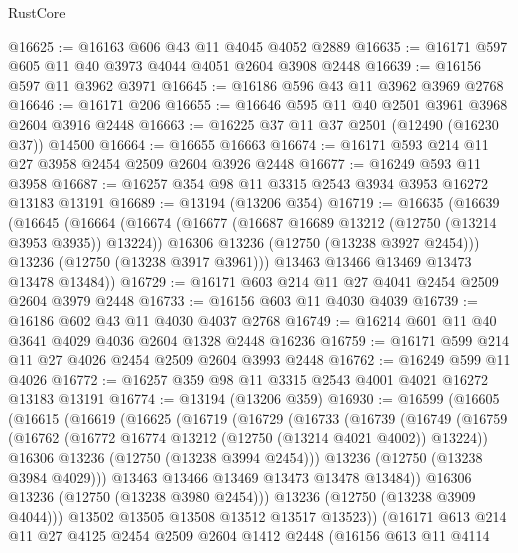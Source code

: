 \begin{lexlean}{RustCore}
\begin{coremodule}
@16625 := @16163 @606 @43 @11 @4045 @4052 @2889
@16635 := @16171 @597 @605 @11 @40 @3973 @4044 @4051 @2604 @3908 @2448
@16639 := @16156 @597 @11 @3962 @3971
@16645 := @16186 @596 @43 @11 @3962 @3969 @2768
@16646 := @16171 @206
@16655 := @16646 @595 @11 @40 @2501 @3961 @3968 @2604 @3916 @2448
@16663 := @16225 @37 @11 @37 @2501 (@12490 (@16230 @37)) @14500
@16664 := @16655 @16663
@16674 := @16171 @593 @214 @11 @27 @3958 @2454 @2509 @2604 @3926 @2448
@16677 := @16249 @593 @11 @3958
@16687 := @16257 @354 @98 @11 @3315 @2543 @3934 @3953 @16272 @13183 @13191
@16689 := @13194 (@13206 @354)
@16719 := @16635
    (@16639
      (@16645
        (@16664
          (@16674
            (@16677 (@16687 @16689 @13212 (@12750 (@13214 @3953 @3935)) @13224))
            @16306
            @13236
            (@12750 (@13238 @3927 @2454)))
          @13236
          (@12750 (@13238 @3917 @3961)))
        @13463
        @13466
        @13469
        @13473
        @13478
        @13484))
@16729 := @16171 @603 @214 @11 @27 @4041 @2454 @2509 @2604 @3979 @2448
@16733 := @16156 @603 @11 @4030 @4039
@16739 := @16186 @602 @43 @11 @4030 @4037 @2768
@16749 := @16214 @601 @11 @40 @3641 @4029 @4036 @2604 @1328 @2448 @16236
@16759 := @16171 @599 @214 @11 @27 @4026 @2454 @2509 @2604 @3993 @2448
@16762 := @16249 @599 @11 @4026
@16772 := @16257 @359 @98 @11 @3315 @2543 @4001 @4021 @16272 @13183 @13191
@16774 := @13194 (@13206 @359)
@16930 := @16599
    (@16605
      (@16615
        (@16619
          (@16625
            (@16719
              (@16729
                (@16733
                  (@16739
                    (@16749
                      (@16759
                        (@16762 (@16772 @16774 @13212 (@12750 (@13214 @4021 @4002)) @13224))
                        @16306
                        @13236
                        (@12750 (@13238 @3994 @2454)))
                      @13236
                      (@12750 (@13238 @3984 @4029)))
                    @13463
                    @13466
                    @13469
                    @13473
                    @13478
                    @13484))
                @16306
                @13236
                (@12750 (@13238 @3980 @2454)))
              @13236
              (@12750 (@13238 @3909 @4044)))
            @13502
            @13505
            @13508
            @13512
            @13517
            @13523))
        (@16171
          @613
          @214
          @11
          @27
          @4125
          @2454
          @2509
          @2604
          @1412
          @2448
          (@16156
            @613
            @11
            @4114

\end{coremodule}
\end{lexlean}
